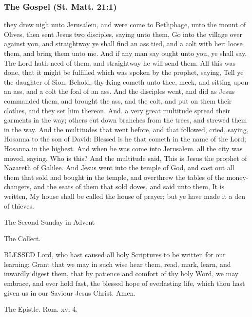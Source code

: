 \subsubsection{The Gospel (St. Matt. 21:1)}
 they drew nigh unto Jerusalem, and were come to Bethphage, unto the mount of Olives, then sent Jesus two disciples, saying unto them, Go into the village over against you, and straightway ye shall find an ass tied, and a colt with her: loose them, and bring them unto me. And if any man say ought unto you, ye shall say, The Lord hath need of them; and straightway he will send them. All this was done, that it might be fulfilled which was spoken by the prophet, saying, Tell ye the daughter of Sion, Behold, thy King cometh unto thee, meek, and sitting upon an ass, and a colt the foal of an ass. And the disciples went, and did as Jesus commanded them, and brought the ass, and the colt, and put on them their clothes, and they set him thereon. And. a very great multitude spread their garments in the way; others cut down branches from the trees, and strewed them in the way. And the multitudes that went before, and that followed, cried, saying, Hosanna to the son of David: Blessed is he that cometh in the name of the Lord; Hosanna in the highest. And when he was come into Jerusalem. all the city was moved, saying, Who is this? And the multitude said, This is Jesus the prophet of Nazareth of Galilee. And Jesus went into the temple of God, and cast out all them that sold and bought in the temple, and overthrew the tables of the money-changers, and the seats of them that sold doves, and said unto them, It is written, My house shall be called the house of prayer; but ye have made it a den of thieves.
 
The Second Sunday in Advent

The Collect.

BLESSED Lord, who hast caused all holy Scriptures to be written for our learning; Grant that we may in such wise hear them, read, mark, learn, and inwardly digest them, that by patience and comfort of thy holy Word, we may embrace, and ever hold fast, the blessed hope of everlasting life, which thou hast given us in our Saviour Jesus Christ. Amen.  
 

The Epistle. Rom. xv. 4.

